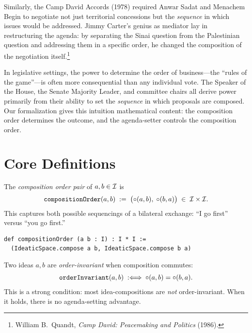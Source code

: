 Similarly, the Camp David Accords (1978) required Anwar Sadat and Menachem
Begin to negotiate not just territorial concessions but the \emph{sequence}
in which issues would be addressed.  Jimmy Carter's genius as mediator lay
in restructuring the agenda: by separating the Sinai question from the
Palestinian question and addressing them in a specific order, he changed
the composition of the negotiation itself.\footnote{William B.\ Quandt,
\textit{Camp David: Peacemaking and Politics} (1986).}

In legislative settings, the power to determine the order of business---the
``rules of the game''---is often more consequential than any individual
vote.  The Speaker of the House, the Senate Majority Leader, and committee
chairs all derive power primarily from their ability to set the
\emph{sequence} in which proposals are composed.  Our formalization gives
this intuition mathematical content: the composition order determines the
outcome, and the agenda-setter controls the composition order.

\section{Core Definitions}
\label{sec:ch17-defs}

\begin{definition}
\label{def:compositionOrder}
The \emph{composition order pair} of $a, b \in \mathcal{I}$ is
\[
  \texttt{compositionOrder}(a, b) \;:=\;
  \bigl(\circ(a, b),\; \circ(b, a)\bigr) \;\in\; \mathcal{I} \times \mathcal{I}.
\]
This captures both possible sequencings of a bilateral exchange: ``I go
first'' versus ``you go first.''
\end{definition}

\begin{lstlisting}[caption={Composition order pair in Lean}]
def compositionOrder (a b : I) : I * I :=
  (IdeaticSpace.compose a b, IdeaticSpace.compose b a)
\end{lstlisting}

\begin{definition}
\label{def:orderInvariant}
Two ideas $a, b$ are \emph{order-invariant} when composition commutes:
\[
  \texttt{orderInvariant}(a, b) \;:\Longleftrightarrow\;
  \circ(a, b) = \circ(b, a).
\]
This is a strong condition: most idea-compositions are \emph{not}
order-invariant.  When it holds, there is no agenda-setting advantage.
\end{definition}

